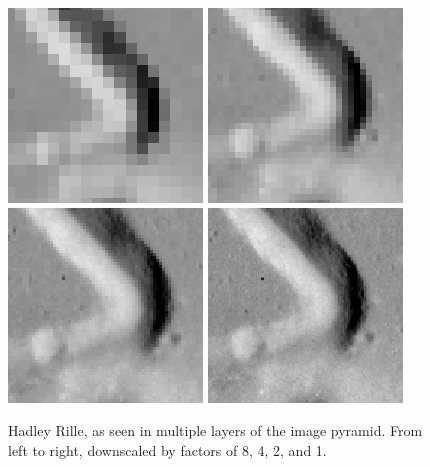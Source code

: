 \documentclass[float=false, crop=false]{standalone}
\begin{document}
\begin{figure}
	\includegraphics[width=0.235\columnwidth]{hadley_rille_8.png}
	\includegraphics[width=0.235\columnwidth]{hadley_rille_4.png}
	\includegraphics[width=0.235\columnwidth]{hadley_rille_2.png}
	\includegraphics[width=0.235\columnwidth]{hadley_rille_1.png}
	\caption{Hadley Rille, as seen in multiple layers of the image pyramid. From left to right, downscaled by factors of 8, 4, 2, and 1.}
	\label{fig:pyramid}
\end{figure}
\end{document}
